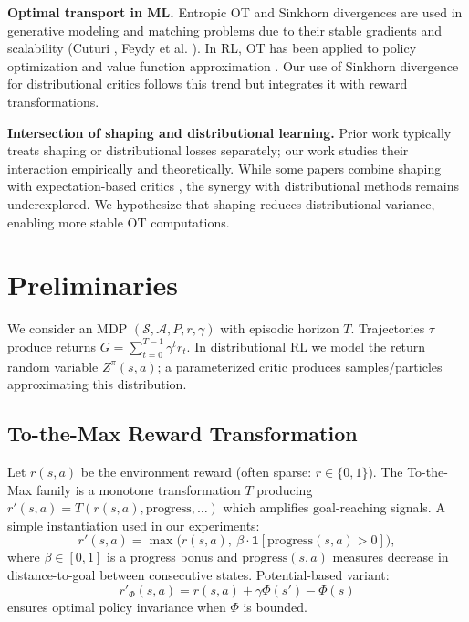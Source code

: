 \documentclass[10pt,twocolumn]{article}
\begin{document}
\textbf{Optimal transport in ML.} Entropic OT and Sinkhorn divergences are used in generative modeling and matching problems due to their stable gradients and scalability (Cuturi \cite{cuturi2013sinkhorn}, Feydy et al. \cite{feydy2019interpolating}). In RL, OT has been applied to policy optimization \cite{metz2017discrete} and value function approximation \cite{abdullah2020wasserstein}. Our use of Sinkhorn divergence for distributional critics follows this trend but integrates it with reward transformations.

\textbf{Intersection of shaping and distributional learning.} Prior work typically treats shaping or distributional losses separately; our work studies their interaction empirically and theoretically. While some papers combine shaping with expectation-based critics \cite{devlin2012dynamic}, the synergy with distributional methods remains underexplored. We hypothesize that shaping reduces distributional variance, enabling more stable OT computations.

\section{Preliminaries}
We consider an MDP $(\mathcal{S},\mathcal{A},P,r,\gamma)$ with episodic horizon $T$. Trajectories $\tau$ produce returns $G=\sum_{t=0}^{T-1}\gamma^t r_t$. In distributional RL we model the return random variable $Z^\pi(s,a)$; a parameterized critic produces samples/particles approximating this distribution.

\subsection{To-the-Max Reward Transformation}
Let $r(s,a)$ be the environment reward (often sparse: $r\in\{0,1\}$). The To-the-Max family is a monotone transformation $T$ producing $r'(s,a)=T(r(s,a),\text{progress},\ldots)$ which amplifies goal-reaching signals. A simple instantiation used in our experiments:
\begin{equation}
r'(s,a) = \max\big(r(s,a),\ \beta\cdot \mathbf{1}[\text{progress}(s,a)>0]\big),
\label{eq:to_max}
\end{equation}
where $\beta\in[0,1]$ is a progress bonus and $\text{progress}(s,a)$ measures decrease in distance-to-goal between consecutive states. Potential-based variant:
\begin{equation}
r'_{\Phi}(s,a) = r(s,a) + \gamma\Phi(s') - \Phi(s)
\label{eq:potential_shaping}
\end{equation}
ensures optimal policy invariance \cite{ng1999policy} when $\Phi$ is bounded.
\end{document}
